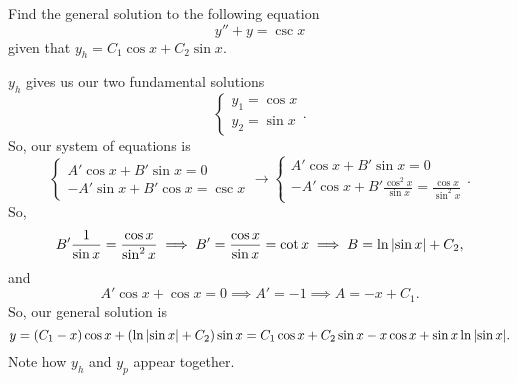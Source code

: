 \begin{example}
	Find the general solution to the following equation
	\begin{equation*}
		y'' + y = \csc{x}
	\end{equation*}
	given that $y_h = C_1\cos{x} + C_2\sin{x}$.
\end{example}
\noindent
$y_h$ gives us our two fundamental solutions
\begin{equation*}
	\begin{cases}
		y_1 = \cos{x} \\
		y_2 = \sin{x}
	\end{cases}.
\end{equation*}
So, our system of equations is
\begin{equation*}
	\begin{cases}
		A'\cos{x} + B'\sin{x} = 0 \\
		-A'\sin{x} + B'\cos{x} = \csc{x}
	\end{cases} \to \begin{cases}
		A'\cos{x} + B'\sin{x} = 0 \\
		-A'\cos{x} + B'\frac{\cos^{2}{x}}{\sin{x}} = \frac{\cos{x}}{\sin^{2}{x}}
	\end{cases}.
\end{equation*}
So, 
\begin{equation*}
	B'\frac{1}{\sin{x}} = \frac{\cos{x}}{\sin^{2}{x}} \implies B' = \frac{\cos{x}}{\sin{x}} = \cot{x} \implies B = \ln{\lvert \sin{x} \rvert} + C_2,
\end{equation*}
and
\begin{equation*}
	A'\cos{x} + \cos{x} = 0 \implies A' = -1 \implies A = -x + C_1.
\end{equation*}
So, our general solution is
\begin{equation*}
	y = \left(C_1 - x\right)\cos{x} + \left(\ln{\lvert \sin{x} \rvert} + C_2\right)\sin{x} = C_1\cos{x} + C_2\sin{x} - x\cos{x} + \sin{x}\ln{\lvert \sin{x} \rvert}.
\end{equation*}
Note how $y_h$ and $y_p$ appear together.